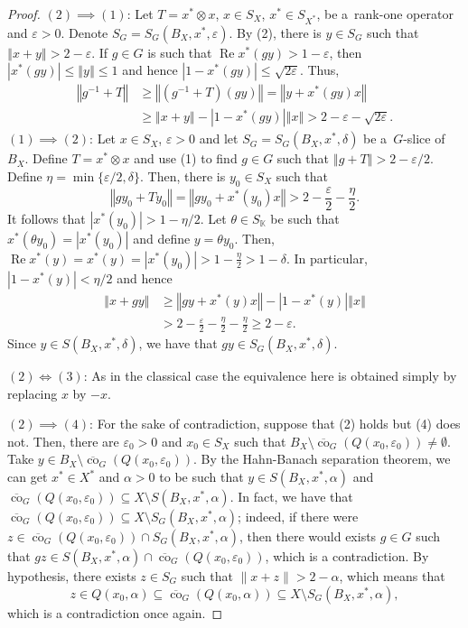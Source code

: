 \documentclass[a4paper,12pt]{amsart}
\theoremstyle{definition}
\theoremstyle{definition}
\theoremstyle{remark}
\numberwithin{equation}{section}
\newcommand{\K}{\mathbb{K}}
\DeclareMathOperator{\co}{co}
\DeclareMathOperator{\re}{Re}
\renewcommand{\geq}{\geqslant}
\renewcommand{\leq}{\leqslant}
\newcommand{\<}{\langle}
\renewcommand{\>}{\rangle}
\newcommand{\norm}[1]{\left\Vert#1\right\Vert}
\newcommand{\abs}[1]{\left\vert#1\right\vert}
\newcommand{\e}{\varepsilon}
\newcommand{\eps}{\e}
\begin{document}
	\begin{proof} $(2) \implies (1)$: Let $T = x^* \otimes x$, $x \in S_X$, $x^* \in S_{X^*}$, be a~rank-one operator and $\eps > 0$.
		Denote $S_G = S_G(B_X, x^*, \eps)$.
		By (2), there is $y \in S_G$ such that $\norm{x + y} > 2 - \eps$. If $g \in G$ is such that $\re x^*(gy) > 1 - \eps$, then $\abs{x^*(gy)} \leq \norm{y} \leq 1$ and hence $\abs{1-x^*(gy)} \leq \sqrt{2\eps}$.
		Thus,
		\begin{align*}
			\norm{g^{-1} + T}
			&\geq \norm{(g^{-1} + T)(gy)}
			= \norm{y + x^*(gy) x}\\
			&\geq \norm{x + y} - \abs{1 - x^*(gy)} \norm{x}
			> 2 - \eps - \sqrt{2\eps}.
		\end{align*}
		\noindent
		$(1) \implies (2)$: Let $x \in S_X$, $\eps > 0$ and let $S_G = S_G(B_X, x^*, \delta)$ be a~$G$-slice of $B_X$.
		Define $T = x^* \otimes x$ and use (1) to find $g \in G$ such that $\norm{g + T} > 2 - \eps/2$. Define $\eta = \min\{\eps/2, \delta\}$.
		Then, there is $y_0 \in S_X$ such that
		\begin{equation*}
			\norm{gy_0 + Ty_0} = \norm{g y_0 + x^*(y_0) x} > 2 - \frac{\eps}{2} - \frac{\eta}{2}.
		\end{equation*}
		It follows that $\abs{x^*(y_0)} > 1 - \eta/2$.
		Let $\theta \in S_\K$ be such that $x^*(\theta y_0) = |x^*(y_0)|$ and define $y = \theta y_0$.
		Then, $\re x^*(y) = x^*(y) = |x^*(y_0)| > 1 - \frac{\eta}{2} > 1 - \delta$. In particular, $\abs{1-x^*(y)} < \eta/2$ and hence
		\begin{align*}
			\norm{x + gy}
			&\geq \norm{gy + x^*(y) x} - \abs{1 - x^*(y)} \norm{x} \\
			&> 2 - \frac{\eps}{2} - \frac{\eta}{2} - \frac{\eta}{2} \geq 2 - \eps.
		\end{align*}
		Since $y \in S(B_X, x^*, \delta)$, we have that $gy \in S_G(B_X, x^*, \delta)$.
		
		
		\noindent
		$(2) \iff (3)$: As in the classical case the equivalence here is obtained simply by replacing $x$ by $-x$.
		
		
		\noindent
		$(2) \implies (4)$: For the sake of contradiction, suppose that (2) holds but (4) does not.
		Then, there are $\e_0>0$ and $x_0 \in S_X$ such that $B_X \setminus \overline{\co}_G(Q(x_0, \e_0)) \not= \emptyset$. Take $y \in B_X \setminus \overline{\co}_G(Q(x_0, \e_0))$. By the Hahn-Banach separation theorem, we can get $x^* \in X^*$ and $\alpha > 0$ to be such that $y \in S(B_X, x^*, \alpha)$ and $\overline{\co}_G(Q(x_0, \e_0)) \subseteq X \setminus S(B_X, x^*, \alpha)$. In fact, we have that $\overline{\co}_G(Q(x_0, \e_0)) \subseteq X \setminus S_G(B_X, x^*, \alpha)$; indeed, if there were $z \in \overline{\co}_G(Q(x_0, \eps_0)) \cap S_G(B_X, x^*, \alpha)$, then there would exists $g \in G$ such that $gz \in S(B_X, x^*, \alpha) \cap \overline{\co}_G(Q(x_0, \eps_0))$, which is a contradiction. By hypothesis, there exists $z \in S_G$ such that $\|x+z\| > 2 - \alpha$, which means that 
		\begin{equation*}
			z \in Q(x_0, \alpha) \subseteq \overline{\co}_G(Q(x_0, \alpha)) \subseteq X \setminus S_G(B_X, x^*, \alpha),
		\end{equation*}
		which is a contradiction once again.
		

\end{proof}
\end{document}
